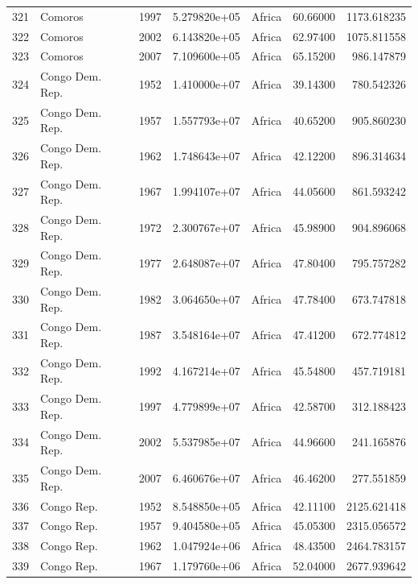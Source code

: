 \documentclass[
  letterpaper,
  DIV=11,
  numbers=noendperiod]{scrreprt}
\begin{document}
\begin{tabular}{llrrlrr}
321  &                   Comoros &  1997 &  5.279820e+05 &    Africa &  60.66000 &    1173.618235 \\
322  &                   Comoros &  2002 &  6.143820e+05 &    Africa &  62.97400 &    1075.811558 \\
323  &                   Comoros &  2007 &  7.109600e+05 &    Africa &  65.15200 &     986.147879 \\
324  &           Congo Dem. Rep. &  1952 &  1.410000e+07 &    Africa &  39.14300 &     780.542326 \\
325  &           Congo Dem. Rep. &  1957 &  1.557793e+07 &    Africa &  40.65200 &     905.860230 \\
326  &           Congo Dem. Rep. &  1962 &  1.748643e+07 &    Africa &  42.12200 &     896.314634 \\
327  &           Congo Dem. Rep. &  1967 &  1.994107e+07 &    Africa &  44.05600 &     861.593242 \\
328  &           Congo Dem. Rep. &  1972 &  2.300767e+07 &    Africa &  45.98900 &     904.896068 \\
329  &           Congo Dem. Rep. &  1977 &  2.648087e+07 &    Africa &  47.80400 &     795.757282 \\
330  &           Congo Dem. Rep. &  1982 &  3.064650e+07 &    Africa &  47.78400 &     673.747818 \\
331  &           Congo Dem. Rep. &  1987 &  3.548164e+07 &    Africa &  47.41200 &     672.774812 \\
332  &           Congo Dem. Rep. &  1992 &  4.167214e+07 &    Africa &  45.54800 &     457.719181 \\
333  &           Congo Dem. Rep. &  1997 &  4.779899e+07 &    Africa &  42.58700 &     312.188423 \\
334  &           Congo Dem. Rep. &  2002 &  5.537985e+07 &    Africa &  44.96600 &     241.165876 \\
335  &           Congo Dem. Rep. &  2007 &  6.460676e+07 &    Africa &  46.46200 &     277.551859 \\
336  &                Congo Rep. &  1952 &  8.548850e+05 &    Africa &  42.11100 &    2125.621418 \\
337  &                Congo Rep. &  1957 &  9.404580e+05 &    Africa &  45.05300 &    2315.056572 \\
338  &                Congo Rep. &  1962 &  1.047924e+06 &    Africa &  48.43500 &    2464.783157 \\
339  &                Congo Rep. &  1967 &  1.179760e+06 &    Africa &  52.04000 &    2677.939642 \\

\end{tabular}
\end{document}
